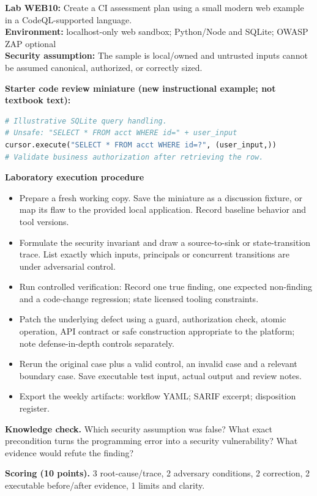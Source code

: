 \documentclass[10pt,letterpaper]{article}
\begin{document}
\begin{insight}\textbf{Lab WEB10:} Create a CI assessment plan using a small modern web example in a CodeQL-supported language.\\\textbf{Environment:} localhost-only web sandbox; Python/Node and SQLite; OWASP ZAP optional\\\textbf{Security assumption:} The sample is local/owned and untrusted inputs cannot be assumed canonical, authorized, or correctly sized.\end{insight}
\textbf{Starter code review miniature (new instructional example; not textbook text):}
\begin{lstlisting}[language=Python]
# Illustrative SQLite query handling.
# Unsafe: "SELECT * FROM acct WHERE id=" + user_input
cursor.execute("SELECT * FROM acct WHERE id=?", (user_input,))
# Validate business authorization after retrieving the row.
\end{lstlisting}
\textbf{Laboratory execution procedure}
\begin{itemize}[leftmargin=*,itemsep=2pt]
\item Prepare a fresh working copy. Save the miniature as a discussion fixture, or map its flaw to the provided local application. Record baseline behavior and tool versions.
\item Formulate the security invariant and draw a source-to-sink or state-transition trace. List exactly which inputs, principals or concurrent transitions are under adversarial control.
\item Run controlled verification: Record one true finding, one expected non-finding and a code-change regression; state licensed tooling constraints.
\item Patch the underlying defect using a guard, authorization check, atomic operation, API contract or safe construction appropriate to the platform; note defense-in-depth controls separately.
\item Rerun the original case plus a valid control, an invalid case and a relevant boundary case. Save executable test input, actual output and review notes.
\item Export the weekly artifacts: workflow YAML; SARIF excerpt; disposition register.
\end{itemize}
\textbf{Knowledge check.} Which security assumption was false? What exact precondition turns the programming error into a security vulnerability? What evidence would refute the finding?

\textbf{Scoring (10 points).} 3 root-cause/trace, 2 adversary conditions, 2 correction, 2 executable before/after evidence, 1 limits and clarity.
\end{document}

